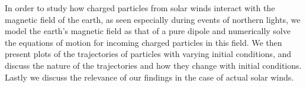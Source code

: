 In order to study how charged particles from solar winds interact with the magnetic field of the earth, as seen especially during events of northern lights, we model the earth's magnetic field as that of a pure dipole and numerically solve the equations of motion for incoming charged particles in this field. We then present plots of the trajectories of particles with varying initial conditions, and discuss the nature of the trajectories and how they change with initial conditions. Lastly we discuss the relevance of our findings in the case of actual solar winds.